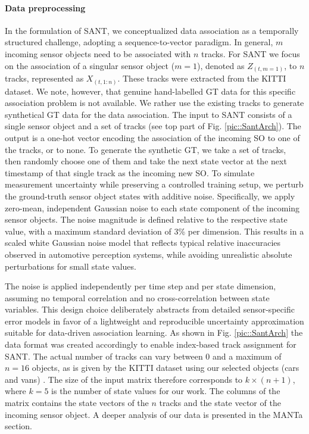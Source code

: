 \documentclass[letterpaper, 10 pt, journal, twoside]{IEEEtran}
\begin{document}
\paragraph{Data preprocessing}
In the formulation of \ac{SANT}, we conceptualized data association as a temporally structured challenge, adopting a sequence-to-vector paradigm.
In general, $m$ incoming sensor objects need to be associated with $n$ tracks.
For \ac{SANT} we focus on the association of a singular sensor object ($m=1$), denoted as $Z_{(t,m=1)}$, to $n$ tracks, represented as $X_{(t,1:n)}$.
These tracks were extracted from the KITTI dataset.
We note, however, that genuine hand-labelled \ac{GT} data for this specific association problem is not available. We rather use the existing tracks to  generate synthetical \ac{GT} data for the data association.
The input to \ac{SANT} consists of a single sensor object and a set of tracks (see top part of Fig. \ref{pic::SantArch}).
The output is a one-hot vector encoding the association of the incoming \ac{SO} to one of the tracks, or to none.
To generate the synthetic \ac{GT}, we take a set of tracks, then randomly choose one of them and take the next state vector at the next timestamp of that single track as the incoming new \ac{SO}. %
To simulate measurement uncertainty while preserving a controlled training setup, we perturb the ground-truth sensor object states with additive noise. Specifically, we apply zero-mean, independent Gaussian noise to each state component of the incoming sensor objects.
The noise magnitude is defined relative to the respective state value, with a maximum standard deviation of 3\% per dimension. This results in a scaled white Gaussian noise model that reflects typical relative inaccuracies observed in automotive perception systems, while avoiding unrealistic absolute perturbations for small state values.

The noise is applied independently per time step and per state dimension, assuming no temporal correlation and no cross-correlation between state variables. This design choice deliberately abstracts from detailed sensor-specific error models in favor of a lightweight and reproducible uncertainty approximation suitable for data-driven association learning.
As shown in Fig. {\ref{pic::SantArch}} the data format was created accordingly to enable index-based track assignment for \ac{SANT}.
The actual number of tracks can vary between 0 and a maximum of $n=16$ objects, as is given by the KITTI dataset using our selected objects (cars and vans) {\cite{Geiger2012CVPR}}.
The size of the input matrix therefore corresponds to $k \times (n + 1)$, where $k = 5$ is the number of state values for our work.
The columns of the matrix contains the state vectors of the $n$ tracks and the state vector of the incoming sensor object.
A deeper analysis of our data is presented in the \ac{MANTa} section.
\end{document}
